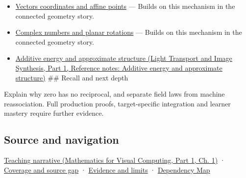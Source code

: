 \begin{itemize}
\item
  \hyperref[appendix-0659864c0aa3]{Vectors coordinates and affine points} --- Builds on this mechanism in the connected geometry story.
\item
  \hyperref[appendix-f77eadcc4a93]{Complex numbers and planar rotations} --- Builds on this mechanism in the connected geometry story.
\item
  \href{../04-Light-Transport-and-Image-Synthesis-P01/main.pdf\#nameddest=appendix-b0732b22e7d6}{Additive energy and approximate structure (Light Transport and Image Synthesis, Part 1, Reference notes: Additive energy and approximate structure)} \#\# Recall and next depth
\end{itemize}

Explain why zero has no reciprocal, and separate field laws from machine reassociation. Full production proofs, target-specific integration and learner mastery require further evidence.

\subsection{Source and navigation}\label{appendix-52051ad550fe-source-and-navigation}

\hypertarget{appendix-52051ad550fe-source-and-navigation}{}

\href{../02-Mathematics-for-Visual-Computing-P01/main.pdf\#nameddest=01-foundations-i-ch017-numbers-become-a-system-of-permitted-operations}{Teaching narrative (Mathematics for Visual Computing, Part 1, Ch. 1)} · \hyperref[appendix-fd090d982a15-phase-6---parts-501-600]{Coverage and source gap} · \hyperref[appendix-a103e7846d21-phase-6---source-analysis-and-verification]{Evidence and limits} · \hyperref[appendix-4ad47bdd269a]{Dependency Map}
